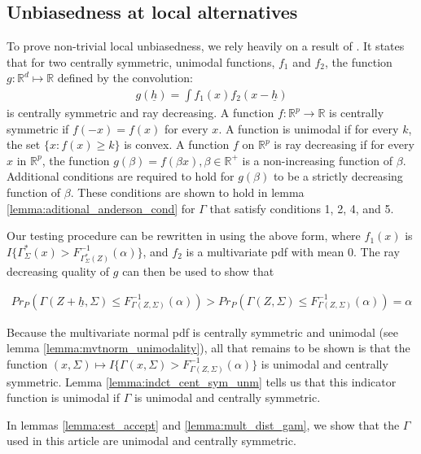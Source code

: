 \documentclass{article}
\newcommand{\vmat}{\Sigma}
\newcommand{\disto}{P}
\newcommand{\rvv}{Z}
\newcommand{\gamz}{\Gamma(\rvv, \Sigma)}
\newcounter{conditions}
\begin{document}
\subsection{Unbiasedness at local alternatives}
To prove non-trivial local unbiasedness, we rely heavily on a result of \citep{eaton_multivariate_1991}. It states that for two centrally symmetric, unimodal functions, $f_1$ and $f_2$, the function $g : \mathbb{R}^d \mapsto \mathbb{R}$ defined by the convolution:  
	\begin{align*}
		g(\underline{h}) = \int f_1(x) f_2(x - \underline{h})
	\end{align*}
	is centrally symmetric and ray decreasing.  A function $f :\mathbb{R}^p\rightarrow\mathbb{R}$ is centrally symmetric if $f(-x) = f(x)$ for every $x$.  A function is unimodal if for every $k$, the set $\{x : f(x) \geq k\}$ is convex. A function $f$ on $\mathbb{R}^p$ is ray decreasing if for every $x$ in $\mathbb{R}^p$, the function $g(\beta) = f(\beta x), \beta \in \mathbb{R}^+$ is a non-increasing function of $\beta$.  Additional conditions are required to hold for $g(\beta)$ to be a strictly decreasing function of $\beta$.  These conditions are shown to hold in lemma \ref{lemma:aditional_anderson_cond} for $\Gamma$ that satisfy conditions 1, 2, 4, and 5.  

Our testing procedure can be rewritten in using the above form, where $f_1(x)$ is $I\{\Gamma^*_{\vmat}(x) > F^{-1}_{\Gamma^*_{\vmat}(\rvv)}(\alpha)\}$, and $f_2$ is a multivariate pdf with mean $0$.  The ray decreasing quality of $g$ can then be used to show that 

\begin{align*}
	Pr_{\disto}\left(\Gamma(Z + \underline{h}, \Sigma) \leq F^{-1}_{\Gamma(\rvv, \Sigma)}(\alpha)\right) > Pr_{\disto}\left(\gamz \leq F^{-1}_{\gamz}(\alpha)\right) = \alpha
\end{align*}

Because the multivariate normal pdf is centrally symmetric and unimodal (see lemma \ref{lemma:mvtnorm_unimodality}), all that remains to be shown is that the function $(x, \Sigma) \mapsto I\{\Gamma(x, \Sigma) > F^{-1}_{\gamz}(\alpha)\}$ is unimodal and centrally symmetric.  Lemma \ref{lemma:indct_cent_sym_unm} tells us that this indicator function is unimodal if $\Gamma$ is unimodal and centrally symmetric.  

In lemmas \ref{lemma:est_accept} and \ref{lemma:mult_dist_gam}, we show that the $\Gamma$ used in this article are unimodal and centrally symmetric.
\end{document}
